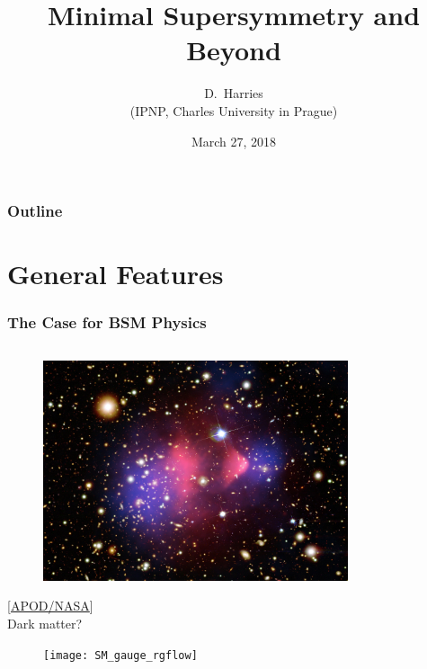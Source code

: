 \documentclass[10pt,aspectratio=169]{beamer}
\title{Minimal Supersymmetry and Beyond}
\author{D.~Harries\\
  {\scriptsize
  (IPNP, Charles University in Prague)}
  }
\date[\'{U}TF, Charles University in Prague]{March 27, 2018}
\begin{document}
\begin{frame}[plain]
  \titlepage
\end{frame}

\begin{frame}
  \frametitle{Outline}
  \tableofcontents
\end{frame}

\section{General Features}

\begin{frame}
  \frametitle{The Case for BSM Physics}
  \begin{columns}[t]
    \begin{column}{0.3\textwidth}
      \vspace*{-15pt}
      \begin{figure}
        \centering
        \includegraphics[width=0.8\textwidth]{bulletcluster}
      \end{figure}
      \vspace{-25pt}
      \begin{center}
        {\tiny [\href{https://apod.nasa.gov/apod/ap060824.html}{APOD/NASA}]} \\
        Dark matter?
      \end{center}
      \vspace{-15pt}
      \begin{figure}
        \centering
        \texttt{[image: SM\_gauge\_rgflow]}
      \end{figure}
      \vspace{-25pt}

\end{column}
\end{columns}
\end{frame}
\end{document}
